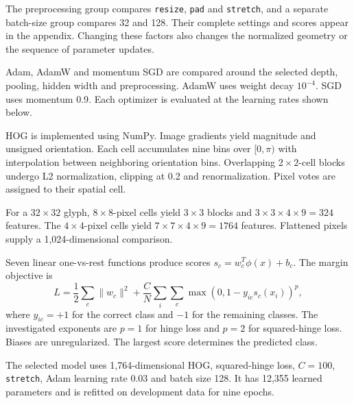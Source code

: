 The preprocessing group compares \texttt{resize}, \texttt{pad} and \texttt{stretch}, and a separate batch-size group compares 32 and 128. Their complete settings and scores appear in the appendix. Changing these factors also changes the normalized geometry or the sequence of parameter updates.


Adam, AdamW and momentum SGD are compared around the selected depth, pooling, hidden width and preprocessing. AdamW uses weight decay $10^{-4}$. SGD uses momentum 0.9. Each optimizer is evaluated at the learning rates shown below.


HOG is implemented using NumPy. Image gradients yield magnitude and unsigned orientation. Each cell accumulates nine bins over $[0,\pi)$ with interpolation between neighboring orientation bins. Overlapping $2\times2$-cell blocks undergo L2 normalization, clipping at 0.2 and renormalization. Pixel votes are assigned to their spatial cell.

For a $32\times32$ glyph, $8\times8$-pixel cells yield $3\times3$ blocks and $3\times3\times4\times9=324$ features. The $4\times4$-pixel cells yield $7\times7\times4\times9=1764$ features. Flattened pixels supply a 1,024-dimensional comparison.

Seven linear one-vs-rest functions produce scores $s_c=w_c^T\phi(x)+b_c$. The margin objective is
\[
L=\frac12\sum_c\|w_c\|^2+
\frac{C}{N}\sum_i\sum_c\max(0,1-y_{ic}s_c(x_i))^p,
\]
where $y_{ic}=+1$ for the correct class and $-1$ for the remaining classes. The investigated exponents are $p=1$ for hinge loss and $p=2$ for squared-hinge loss. Biases are unregularized. The largest score determines the predicted class.

The selected model uses 1,764-dimensional HOG, squared-hinge loss, $C=100$, \texttt{stretch}, Adam learning rate 0.03 and batch size 128. It has 12,355 learned parameters and is refitted on development data for nine epochs.

